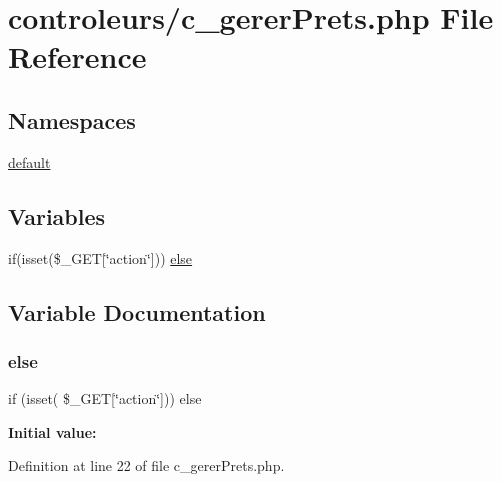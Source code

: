 \hypertarget{c__gerer_prets_8php}{}\section{controleurs/c\+\_\+gerer\+Prets.php File Reference}
\label{c__gerer_prets_8php}
\subsection*{Namespaces}
\begin{DoxyCompactItemize}
\item 
 \hyperlink{namespacedefault}{default}
\end{DoxyCompactItemize}
\subsection*{Variables}
\begin{DoxyCompactItemize}
\item 
if(isset(\$\+\_\+\+G\+ET\mbox{[}\char`\"{}action\char`\"{}\mbox{]})) \hyperlink{c__gerer_prets_8php_aa4db7f7a27517cf5cd3ff1f2577caa64}{else}
\end{DoxyCompactItemize}


\subsection{Variable Documentation}
\mbox{\label{c__gerer_prets_8php_aa4db7f7a27517cf5cd3ff1f2577caa64}} 
\subsubsection{\texorpdfstring{else}{else}}
{\footnotesize\ttfamily if (isset( \$\+\_\+\+G\+ET\mbox{[}\char`\"{}action\char`\"{}\mbox{]})) else}

{\bfseries Initial value\+:}


Definition at line 22 of file c\+\_\+gerer\+Prets.\+php.

